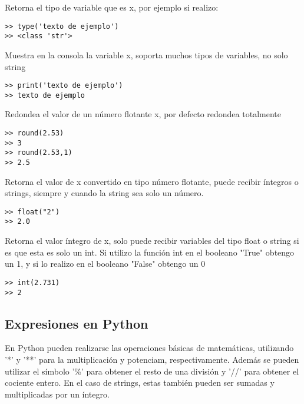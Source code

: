 \documentclass[10pt,a4paper]{article}
\begin{document}
\begin{description}[align=right,labelwidth=1cm,labelsep=0.5cm, itemindent=0cm]


\item [type(x)] Retorna el tipo de variable que es x, por ejemplo si realizo:
\begin{lstlisting}
>> type('texto de ejemplo')
>> <class 'str'>\end{lstlisting}
\item [print(x)] Muestra en la consola la variable x, soporta muchos tipos de variables, no solo string
\begin{lstlisting}
>> print('texto de ejemplo')
>> texto de ejemplo\end{lstlisting}
\item [round(x)] Redondea el valor de un número flotante x, por defecto redondea totalmente
\begin{lstlisting}
>> round(2.53)
>> 3
>> round(2.53,1)
>> 2.5\end{lstlisting}
\item [float(x)] Retorna el valor de x convertido en tipo número flotante, puede recibir íntegros o strings, siempre y cuando la string sea solo un número.
\begin{lstlisting}
>> float("2")
>> 2.0\end{lstlisting}

\item [int(x)] Retorna el valor íntegro de x, solo puede recibir variables del tipo float o string si es que esta es solo un int. Si utilizo la función int en el booleano "True" obtengo un 1, y si lo realizo en el booleano "False" obtengo un 0
\begin{lstlisting}
>> int(2.731)
>> 2\end{lstlisting}


\end{description}

\subsection{Expresiones en Python}
En Python pueden realizarse las operaciones básicas de matemáticas, utilizando '*' y '**' para la multiplicación y potenciam, respectivamente. Además se pueden utilizar el símbolo '\%' para obtener el resto de una división y '//' para obtener el cociente entero. En el caso de strings, estas también pueden ser sumadas y multiplicadas por un íntegro.
\end{document}
